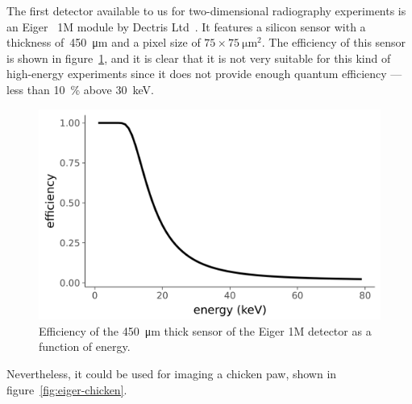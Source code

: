 The first detector available to us for two-dimensional radiography experiments is
an Eiger~\parencite{1748-0221-9-05-C05032} 1M module by Dectris Ltd~\parencite{dectris-eiger}.
It features a silicon sensor
with a thickness of~\SI{450}{\micro\meter} and a pixel size of
$75\times\SI{75}{\micro\meter\squared}$. The efficiency of this sensor is
shown in figure~\ref{fig:eiger-efficiency}, and it is clear that it is not
very suitable for this kind of high-energy experiments since it does not
provide enough quantum efficiency --- less than \SI{10}{\percent} above
\SI{30}{\kilo\eV}.

\begin{figure}[htb]
    \centering
    \includegraphics[width=\textwidth]{gfx/eiger/efficiency.png}
    \caption[Efficiency of the Eiger silicon detector]{Efficiency of the \SI{450}{\micro\meter} thick sensor of the
Eiger 1M detector as a function of energy.}
    \label{fig:eiger-efficiency}
\end{figure}

Nevertheless, it could be used for imaging a chicken paw, shown in
figure~\ref{fig:eiger-chicken}.


